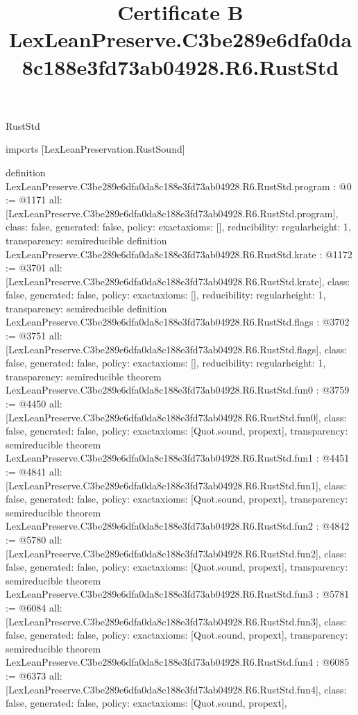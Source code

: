 \begin{lexlean}{RustStd}
\title{Certificate B LexLeanPreserve.C3be289e6dfa0da8c188e3fd73ab04928.R6.RustStd}
\begin{coremodule}
imports [LexLeanPreservation.RustSound]

definition LexLeanPreserve.C3be289e6dfa0da8c188e3fd73ab04928.R6.RustStd.program : @0 := @1171 {
  all: [LexLeanPreserve.C3be289e6dfa0da8c188e3fd73ab04928.R6.RustStd.program],
  class: false,
  generated: false,
  policy: exact{axioms: []},
  reducibility: regular{height: 1},
  transparency: semireducible
}
definition LexLeanPreserve.C3be289e6dfa0da8c188e3fd73ab04928.R6.RustStd.krate : @1172 := @3701 {
  all: [LexLeanPreserve.C3be289e6dfa0da8c188e3fd73ab04928.R6.RustStd.krate],
  class: false,
  generated: false,
  policy: exact{axioms: []},
  reducibility: regular{height: 1},
  transparency: semireducible
}
definition LexLeanPreserve.C3be289e6dfa0da8c188e3fd73ab04928.R6.RustStd.flags : @3702 := @3751 {
  all: [LexLeanPreserve.C3be289e6dfa0da8c188e3fd73ab04928.R6.RustStd.flags],
  class: false,
  generated: false,
  policy: exact{axioms: []},
  reducibility: regular{height: 1},
  transparency: semireducible
}
theorem LexLeanPreserve.C3be289e6dfa0da8c188e3fd73ab04928.R6.RustStd.fun0 : @3759 := @4450 {
  all: [LexLeanPreserve.C3be289e6dfa0da8c188e3fd73ab04928.R6.RustStd.fun0],
  class: false,
  generated: false,
  policy: exact{axioms: [Quot.sound, propext]},
  transparency: semireducible
}
theorem LexLeanPreserve.C3be289e6dfa0da8c188e3fd73ab04928.R6.RustStd.fun1 : @4451 := @4841 {
  all: [LexLeanPreserve.C3be289e6dfa0da8c188e3fd73ab04928.R6.RustStd.fun1],
  class: false,
  generated: false,
  policy: exact{axioms: [Quot.sound, propext]},
  transparency: semireducible
}
theorem LexLeanPreserve.C3be289e6dfa0da8c188e3fd73ab04928.R6.RustStd.fun2 : @4842 := @5780 {
  all: [LexLeanPreserve.C3be289e6dfa0da8c188e3fd73ab04928.R6.RustStd.fun2],
  class: false,
  generated: false,
  policy: exact{axioms: [Quot.sound, propext]},
  transparency: semireducible
}
theorem LexLeanPreserve.C3be289e6dfa0da8c188e3fd73ab04928.R6.RustStd.fun3 : @5781 := @6084 {
  all: [LexLeanPreserve.C3be289e6dfa0da8c188e3fd73ab04928.R6.RustStd.fun3],
  class: false,
  generated: false,
  policy: exact{axioms: [Quot.sound, propext]},
  transparency: semireducible
}
theorem LexLeanPreserve.C3be289e6dfa0da8c188e3fd73ab04928.R6.RustStd.fun4 : @6085 := @6373 {
  all: [LexLeanPreserve.C3be289e6dfa0da8c188e3fd73ab04928.R6.RustStd.fun4],
  class: false,
  generated: false,
  policy: exact{axioms: [Quot.sound, propext]},
}
\end{coremodule}
\end{lexlean}
